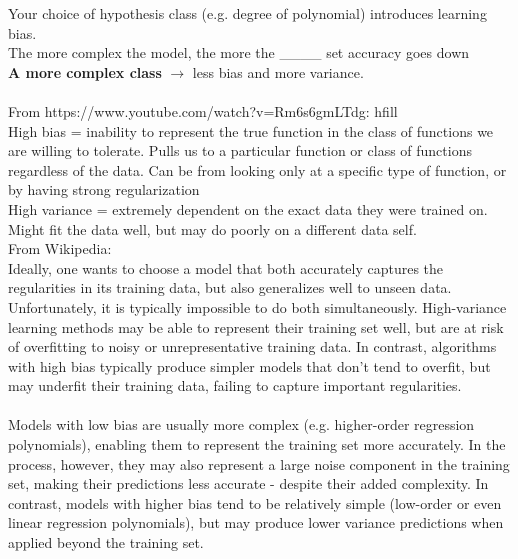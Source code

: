 Your choice of hypothesis class (e.g. degree of polynomial) introduces learning bias.  \hfill \\
The more complex the model, the more the \_\_\_\_ set accuracy goes down  \hfill \\  %
\textbf{A more complex class } $\rightarrow$ less bias and more variance.   \hfill \\ \hfill \\

From https://www.youtube.com/watch?v=Rm6s6gmLTdg: hfill \\
High bias = inability to represent the true function in the class of functions we are willing to tolerate.
Pulls us to a particular function or class of functions regardless of the data.
Can be from looking only at a specific type of function, or by having strong regularization  \hfill \\
High variance = extremely dependent on the exact data they were trained on.
Might fit the data well, but may do poorly on a different data self.  \hfill \\


From Wikipedia: \hfill \\  %
Ideally, one wants to choose a model that both accurately captures the regularities in its training data, 
but also generalizes well to unseen data. Unfortunately, it is typically impossible to do both simultaneously. 
High-variance learning methods may be able to represent their training set well, but are at risk of overfitting 
to noisy or unrepresentative training data. 
In contrast, algorithms with high bias typically produce simpler models that don't tend to overfit, 
but may underfit their training data, failing to capture important regularities. \hfill \\  \hfill \\

Models with low bias are usually more complex (e.g. higher-order regression polynomials), 
enabling them to represent the training set more accurately. 
In the process, however, they may also represent a large noise component in the training set, 
making their predictions less accurate - despite their added complexity. 
In contrast, models with higher bias tend to be relatively simple (low-order or even linear regression polynomials), 
but may produce lower variance predictions when applied beyond the training set. \hfill \\ \hfill \\

